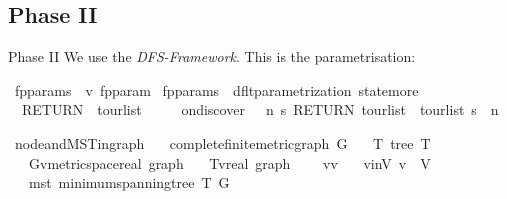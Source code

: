 \documentclass[%
	sans,
	12pt,
]{beamer}
\def\isacartoucheopen{}%
\def\isacartoucheclose{}%
\begin{document}
\subsection{Phase II}
\begin{frame}{Phase II}
\vspace{8mm}
We use the \textit{DFS-Framework}. This is the parametrisation:
\vspace{-2mm}
\begin{isabelle}
	\isamarkupfalse%
	\ fp{}{\isacharunderscore}params\ {\isacharcolon}{\isacharcolon}\ {\isachardoublequoteopen}{\isacharprime}v\ fp{}{\isacharunderscore}param{\isachardoublequoteclose}\ \isanewline
	{\isachardoublequoteopen}fp{}{\isacharunderscore}params\ {\isasymequiv}\ dflt{\isacharunderscore}parametrization\ state{\isachardot}more\isanewline
	\ \ {\isacharparenleft}RETURN\ {\isasymlparr}\ tour{\isacharunderscore}list\ {\isacharequal}\ {\isacharbrackleft}{\isacharbrackright}\ {\isasymrparr}{\isacharparenright}\isanewline
	\ \ {\isasymlparr}on{\isacharunderscore}discover\ {\isacharcolon}{\isacharequal}\ {\isasymlambda}{\isacharunderscore}\ n\ s{\isachardot}\ RETURN\ {\isasymlparr}tour{\isacharunderscore}list\ {\isacharequal}\ tour{\isacharunderscore}list\ s\ {\isacharat}\ {\isacharbrackleft}n{\isacharbrackright}{\isasymrparr}\ {\isasymrparr}{\isachardoublequoteclose}
\end{isabelle}\pause
\vspace{-5mm}
\begin{isabelle}
	\isamarkupfalse%
	\ node{\isacharunderscore}and{\isacharunderscore}MST{\isacharunderscore}in{\isacharunderscore}graph\ {\isacharequal}\isanewline
	\ \ complete{\isacharunderscore}finite{\isacharunderscore}metric{\isacharunderscore}graph\ G\ {\isacharplus}\isanewline
	\ \ T{\isacharcolon}\ tree\ T\isanewline
	\ \ \ G{\isacharcolon}{\isacharcolon}{\isacartoucheopen}{\isacharparenleft}{\isacharprime}v{\isacharcolon}{\isacharcolon}metric{\isacharunderscore}space{\isacharcomma}real{\isacharparenright}\ graph{\isacartoucheclose}\isanewline
	\ \ \ T{\isacharcolon}{\isacharcolon}{\isacartoucheopen}{\isacharparenleft}{\isacharprime}v{\isacharcomma}real{\isacharparenright}\ graph{\isacartoucheclose}\ {\isacharplus}\isanewline
	\ \ \ v\isactrlsub {\isadigit{0}}{\isacharcolon}{\isacharcolon}{\isacartoucheopen}{\isacharprime}v{\isacartoucheclose}\isanewline
	\ \ \ v{\isacharunderscore}in{\isacharunderscore}V{\isacharcolon}\ {\isacartoucheopen}v\ {\isasymin}\ V{\isacartoucheclose}\isanewline
	\ \ \ mst{\isacharcolon}\ {\isacartoucheopen}minimum{\isacharunderscore}spanning{\isacharunderscore}tree\ T\ G{\isacartoucheclose}
\end{isabelle}
\end{frame}
\end{document}
